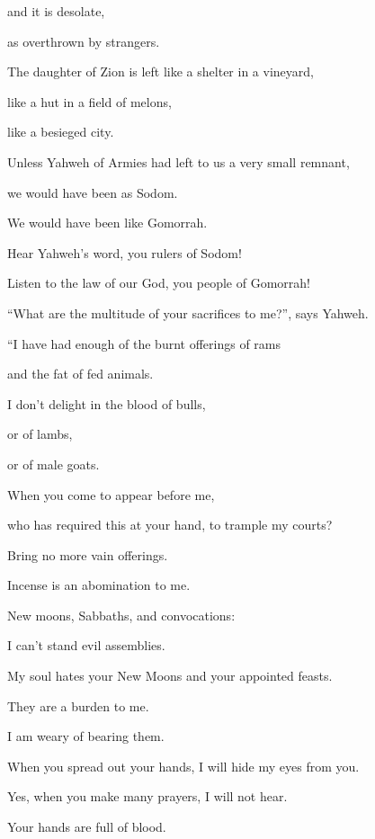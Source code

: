 {\par }{\QB and it is desolate,
\par }{\QB as overthrown by strangers.
\par }{\Q {}The daughter of Zion is left like a shelter in a vineyard,
\par }{\QB like a hut in a field of melons,
\par }{\QB like a besieged city.
\par }{\Q {}Unless Yahweh of Armies had left to us a very small remnant,
\par }{\QB we would have been as Sodom.
\par }{\QB We would have been like Gomorrah.
\par }{\BB \par }{\Q {}Hear Yahweh’s word, you rulers of Sodom!
\par }{\QB Listen to the law of our God, you people of Gomorrah!
\par }{\Q {}“What are the multitude of your sacrifices to me?”, says Yahweh.
\par }{\QB “I have had enough of the burnt offerings of rams
\par }{\QB and the fat of fed animals.
\par }{\QB I don’t delight in the blood of bulls,
\par }{\QB or of lambs,
\par }{\QB or of male goats.
\par }{\Q {}When you come to appear before me,
\par }{\QB who has required this at your hand, to trample my courts?
\par }{\Q {}Bring no more vain offerings.
\par }{\QB Incense is an abomination to me.
\par }{\QB New moons, Sabbaths, and convocations:
\par }{\QB I can’t stand evil assemblies.
\par }{\Q {}My soul hates your New Moons and your appointed feasts.
\par }{\QB They are a burden to me.
\par }{\QB I am weary of bearing them.
\par }{\Q {}When you spread out your hands, I will hide my eyes from you.
\par }{\QB Yes, when you make many prayers, I will not hear.
\par }{\QB Your hands are full of blood.
}
